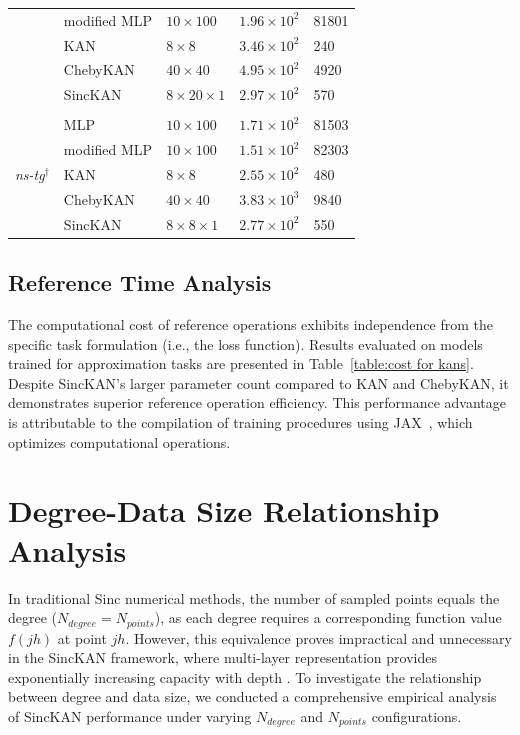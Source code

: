 \begin{table}[ht]
\begin{center}
\begin{tabular}{lllll}
                      & modified MLP & $10\times 100$ & $1.96\times 10^{2}$ & 81801\\ 
                      & KAN & $8\times 8$ & $3.46\times 10^{2}$ & 240\\ 
                      & ChebyKAN & $40\times 40$ & $4.95\times 10^{2}$ & 4920 \\ 
                      & SincKAN & $8\times 20 \times 1$ & $2.97\times 10^{2}$ & 570 \\ 
\\
\multirow{5}{*}{\textit{ns-tg}$^\dag$ } & MLP & $10\times 100$ & $1.71\times 10^{2}$ & 81503\\ 
                      & modified MLP & $10\times 100$ & $1.51\times 10^{2}$ & 82303\\ 
                      & KAN & $8\times 8$ & $2.55\times 10^{2}$ & 480\\ 
                      & ChebyKAN & $40\times 40$ & $3.83\times 10^{3}$ & 9840 \\ 
                      & SincKAN & $8\times 8 \times 1$ & $2.77\times 10^{2}$ & 550 \\ 
\end{tabular}
\end{center}
\end{table}

\subsection{Reference Time Analysis}
The computational cost of reference operations exhibits independence from the specific task formulation (i.e., the loss function). Results evaluated on models trained for approximation tasks are presented in Table~\ref{table:cost for kans}. Despite SincKAN's larger parameter count compared to KAN and ChebyKAN, it demonstrates superior reference operation efficiency. This performance advantage is attributable to the compilation of training procedures using JAX~\cite{jax2018github}, which optimizes computational operations.

\section{Degree-Data Size Relationship Analysis}\label{Appendix: scaling law}
In traditional Sinc numerical methods, the number of sampled points equals the degree ($N_{degree}=N_{points}$), as each degree requires a corresponding function value $f(jh)$ at point $jh$. However, this equivalence proves impractical and unnecessary in the SincKAN framework, where multi-layer representation provides exponentially increasing capacity with depth \citep{yarotsky2017error}. To investigate the relationship between degree and data size, we conducted a comprehensive empirical analysis of SincKAN performance under varying $N_{degree}$ and $N_{points}$ configurations.

